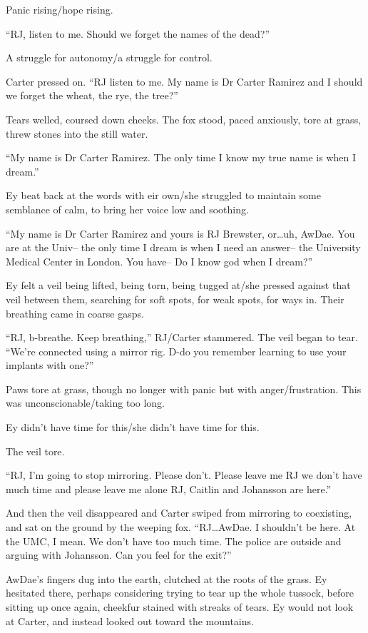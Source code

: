 Panic rising/hope rising.

``RJ, listen to me. Should we forget the names of the dead?''

A struggle for autonomy/a struggle for control.

Carter pressed on. ``RJ listen to me. My name is Dr Carter Ramirez and I should we forget the wheat, the rye, the tree?''

Tears welled, coursed down cheeks. The fox stood, paced anxiously, tore at grass, threw stones into the still water.

``My name is Dr Carter Ramirez. The only time I know my true name is when I dream.''

Ey beat back at the words with eir own/she struggled to maintain some semblance of calm, to bring her voice low and soothing.

``My name is Dr Carter Ramirez and yours is RJ Brewster, or\ldots{}uh, AwDae. You are at the Univ-- the only time I dream is when I need an answer-- the University Medical Center in London. You have-- Do I know god when I dream?''

Ey felt a veil being lifted, being torn, being tugged at/she pressed against that veil between them, searching for soft spots, for weak spots, for ways in. Their breathing came in coarse gasps.

``RJ, b-breathe. Keep breathing,'' RJ/Carter stammered. The veil began to tear. ``We're connected using a mirror rig. D-do you remember learning to use your implants with one?''

Paws tore at grass, though no longer with panic but with anger/frustration. This was unconscionable/taking too long.

Ey didn't have time for this/she didn't have time for this.

The veil tore.

``RJ, I'm going to stop mirroring. Please don't. Please leave me RJ we don't have much time and please leave me alone RJ, Caitlin and Johansson are here.''

And then the veil disappeared and Carter swiped from mirroring to coexisting, and sat on the ground by the weeping fox. ``RJ\ldots{}AwDae. I shouldn't be here. At the UMC, I mean. We don't have too much time. The police are outside and arguing with Johansson. Can you feel for the exit?''

AwDae's fingers dug into the earth, clutched at the roots of the grass. Ey hesitated there, perhaps considering trying to tear up the whole tussock, before sitting up once again, cheekfur stained with streaks of tears. Ey would not look at Carter, and instead looked out toward the mountains.

